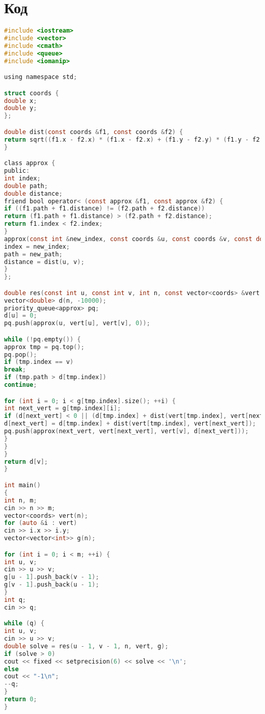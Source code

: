 \pagebreak

\section{Код}

\begin{lstlisting}[language=C]
#include <iostream>
#include <vector>
#include <cmath>
#include <queue>
#include <iomanip>

using namespace std;

struct coords {
double x;
double y;
};

double dist(const coords &f1, const coords &f2) {
return sqrt((f1.x - f2.x) * (f1.x - f2.x) + (f1.y - f2.y) * (f1.y - f2.y));
}

class approx {
public:
int index;
double path;
double distance;
friend bool operator< (const approx &f1, const approx &f2) {
if ((f1.path + f1.distance) != (f2.path + f2.distance))
return (f1.path + f1.distance) > (f2.path + f2.distance);
return f1.index < f2.index;
}
approx(const int &new_index, const coords &u, const coords &v, const double &new_path) {
index = new_index;
path = new_path;
distance = dist(u, v);
}
};

double res(const int u, const int v, int n, const vector<coords> &vert, const vector<vector<int>> &g) {
vector<double> d(n, -10000);
priority_queue<approx> pq;
d[u] = 0;
pq.push(approx(u, vert[u], vert[v], 0));

while (!pq.empty()) {
approx tmp = pq.top();
pq.pop();
if (tmp.index == v)
break;
if (tmp.path > d[tmp.index])
continue;

for (int i = 0; i < g[tmp.index].size(); ++i) {
int next_vert = g[tmp.index][i];
if (d[next_vert] < 0 || (d[tmp.index] + dist(vert[tmp.index], vert[next_vert])) < d[next_vert]){
d[next_vert] = d[tmp.index] + dist(vert[tmp.index], vert[next_vert]);
pq.push(approx(next_vert, vert[next_vert], vert[v], d[next_vert]));
}
}
}
return d[v];
}

int main()
{
int n, m;
cin >> n >> m;
vector<coords> vert(n);
for (auto &i : vert)
cin >> i.x >> i.y;
vector<vector<int>> g(n);

for (int i = 0; i < m; ++i) {
int u, v;
cin >> u >> v;
g[u - 1].push_back(v - 1);
g[v - 1].push_back(u - 1);
}
int q;
cin >> q;

while (q) {
int u, v;
cin >> u >> v;
double solve = res(u - 1, v - 1, n, vert, g);
if (solve > 0)
cout << fixed << setprecision(6) << solve << '\n';
else
cout << "-1\n";
--q;
}
return 0;
}
\end{lstlisting}

\pagebreak